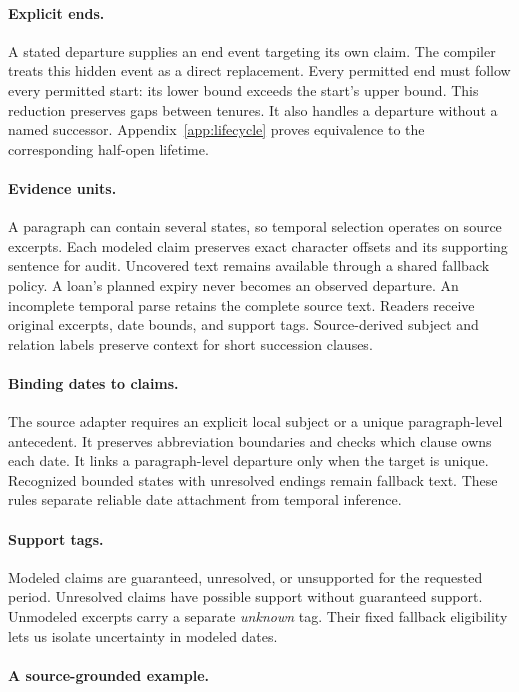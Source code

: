 \paragraph{Explicit ends.}
A stated departure supplies an end event targeting its own claim.
The compiler treats this hidden event as a direct replacement.
Every permitted end must follow every permitted start: its lower bound exceeds the start's upper bound.
This reduction preserves gaps between tenures.
It also handles a departure without a named successor.
Appendix~\ref{app:lifecycle} proves equivalence to the corresponding half-open lifetime.

\paragraph{Evidence units.}
A paragraph can contain several states, so temporal selection operates on source excerpts.
Each modeled claim preserves exact character offsets and its supporting sentence for audit.
Uncovered text remains available through a shared fallback policy.
A loan's planned expiry never becomes an observed departure.
An incomplete temporal parse retains the complete source text.
Readers receive original excerpts, date bounds, and support tags.
Source-derived subject and relation labels preserve context for short succession clauses.

\paragraph{Binding dates to claims.}
The source adapter requires an explicit local subject or a unique paragraph-level antecedent.
It preserves abbreviation boundaries and checks which clause owns each date.
It links a paragraph-level departure only when the target is unique.
Recognized bounded states with unresolved endings remain fallback text.
These rules separate reliable date attachment from temporal inference.

\paragraph{Support tags.}
Modeled claims are guaranteed, unresolved, or unsupported for the requested period.
Unresolved claims have possible support without guaranteed support.
Unmodeled excerpts carry a separate \emph{unknown} tag.
Their fixed fallback eligibility lets us isolate uncertainty in modeled dates.

\paragraph{A source-grounded example.}

